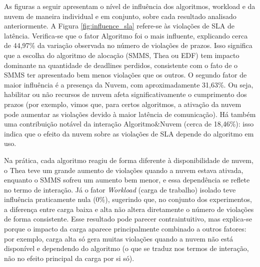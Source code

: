 As figuras a seguir apresentam o nível de influência dos algoritmos, workload e da nuvem de maneira individual e em conjunto, sobre cada resultado analisado anteriormente. A Figura \ref{fig:influence_sla} refere-se às violações de SLA de latência. Verifica-se que o fator Algoritmo foi o mais influente, explicando cerca de 44,97\% da variação observada no número de violações de prazos. Isso significa que a escolha do algoritmo de alocação (SMMS, Thea ou EDF) tem impacto dominante na quantidade de deadlines perdidos, consistente com o fato de o SMMS ter apresentado bem menos violações que os outros. O segundo fator de maior influência é a presença da Nuvem, com aproximadamente 31,63\%. Ou seja, habilitar ou não recursos de nuvem afeta significativamente o cumprimento dos prazos (por exemplo, vimos que, para certos algoritmos, a ativação da nuvem pode aumentar as violações devido à maior latência de comunicação). Há também uma contribuição notável da interação Algoritmo\&Nuvem (cerca de 18,46\%): isso indica que o efeito da nuvem sobre as violações de SLA depende do algoritmo em uso. 

Na prática, cada algoritmo reagiu de forma diferente à disponibilidade de nuvem, o Thea teve um grande aumento de violações quando a nuvem estava ativada, enquanto o SMMS sofreu um aumento bem menor, e essa dependência se reflete no termo de interação. Já o fator \textit{Workload} (carga de trabalho) isolado teve influência praticamente nula (0\%), sugerindo que, no conjunto dos experimentos, a diferença entre carga baixa e alta não altera diretamente o número de violações de forma consistente. Esse resultado pode parecer contraintuitivo, mas explica-se porque o impacto da carga aparece principalmente combinado a outros fatores: por exemplo, carga alta só gera muitas violações quando a nuvem não está disponível e dependendo do algoritmo (o que se traduz nos termos de interação, não no efeito principal da carga por si só).



